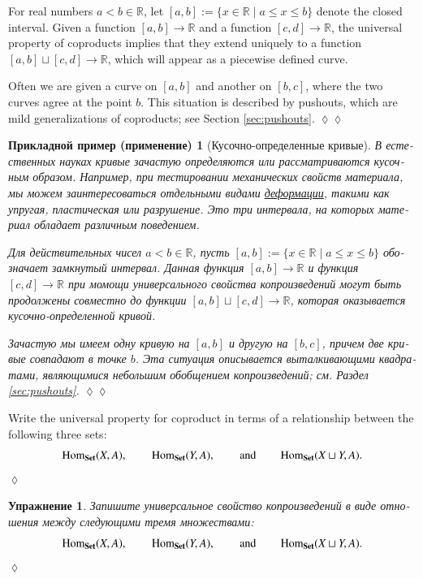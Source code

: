 \documentclass[a4paper]{book}
\def\tn{\textnormal}
\def\RR{{\mathbb R}}
\def\Hom{\tn{Hom}}
\def\hsp{\hspace{.3in}}
\def\to{\rightarrow}
\def\|{{\;|\;}}
\def\Set{{\bf Set}}
\theoremstyle{myth}
\newtheorem{excENG}[envENG]{\begin{english}Exercise\end{english}}
\newtheorem{appENG}[envENG]{\begin{english}Application\end{english}}
\newenvironment{exerciseENG}{\begin{excENG}}{\hspace*{\fill}$\lozenge$\end{excENG}}
\newenvironment{applicationENG}{\begin{appENG}}{\hspace*{\fill}$\lozenge\lozenge$\end{appENG}}
\newtheorem{excRUS}[envRUS]{Упражнение}
\newtheorem{appRUS}[envRUS]{Прикладной пример (применение)}
\newenvironment{exerciseRUS}{\begin{excRUS}}{\hspace*{\fill}$\lozenge$\end{excRUS}}
\newenvironment{applicationRUS}{\begin{appRUS}}{\hspace*{\fill}$\lozenge\lozenge$\end{appRUS}}
\begin{document}
\begin{russian}
\begin{applicationENG}[Piecewise defined curves]
For real numbers $a<b\in\RR$, let $[a,b]:=\{x\in\RR\|a\leq x\leq b\}$ denote the closed interval. Given a function $[a,b]\to\RR$ and a function $[c,d]\to\RR$, the universal property of coproducts implies that they extend uniquely to a function $[a,b]\sqcup[c,d]\to\RR$, which will appear as a piecewise defined curve.

Often we are given a curve on $[a,b]$ and another on $[b,c]$, where the two curves agree at the point $b$. This situation is described by pushouts, which are mild generalizations of coproducts; see Section \ref{sec:pushouts}.
\end{applicationENG}

\begin{applicationRUS}[Кусочно-определенные кривые]
В естественных науках кривые зачастую определяются или рассматриваются кусочным образом. Например, при тестировании механических свойств материала, мы можем заинтересоваться отдельными видами \href{https://ru.wikipedia.org/wiki/%D0%94%D0%B5%D1%84%D0%BE%D1%80%D0%BC%D0%B0%D1%86%D0%B8%D1%8F}{деформации}, такими как упругая, пластическая или разрушение. Это три интервала, на которых материал обладает различным поведением. 

Для действительных чисел $a<b\in\RR$, пусть $[a,b]:=\{x\in\RR\|a\leq x\leq b\}$ обозначает замкнутый интервал. Данная функция $[a,b]\to\RR$ и функция $[c,d]\to\RR$ при момощи универсального свойства копроизведений могут быть продолжены совместно до функции $[a,b]\sqcup[c,d]\to\RR$, которая оказывается кусочно-определенной кривой.

Зачастую мы имеем одну кривую на $[a,b]$ и другую на $[b,c]$, причем две кривые совпадают в точке $b$. Эта ситуация описывается выталкивающими квадратами, являющимися небольшим обобщением копроизведений; см. Раздел \ref{sec:pushouts}.
\end{applicationRUS}

\begin{exerciseENG}\label{exc:coprod}
Write the universal property for coproduct in terms of a relationship between the following three sets: $$\Hom_{\Set}(X,A), \hsp \Hom_\Set(Y,A), \hsp \text{and} \hsp\Hom_\Set(X\sqcup Y,A).$$ 
\end{exerciseENG}

\begin{exerciseRUS}\label{exc:coprod}
Запишите универсальное свойство копроизведений в виде отношения между следующими тремя множествами: $$\Hom_{\Set}(X,A), \hsp \Hom_\Set(Y,A), \hsp \text{and} \hsp\Hom_\Set(X\sqcup Y,A).$$ 
\end{exerciseRUS}


\end{russian}
\end{document}
